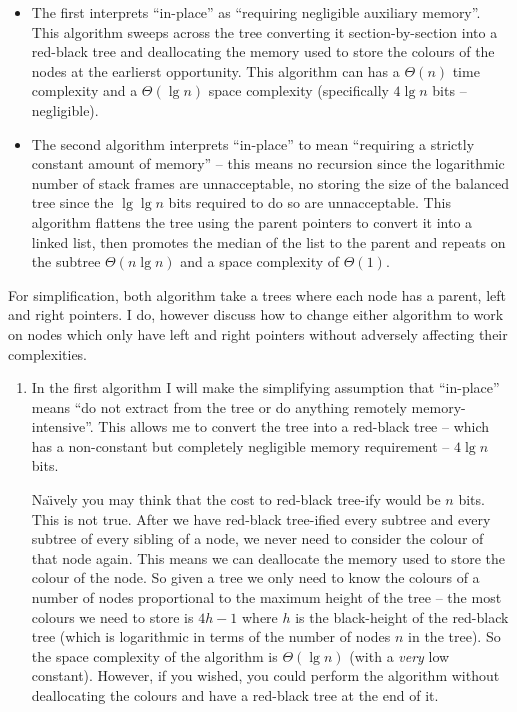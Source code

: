 \documentclass[10pt,\jkfside,a4paper]{article}
\begin{document}
\begin{enumerate}
\begin{itemize}

\item The first interprets ``in-place'' as ``requiring negligible auxiliary memory''. 
This algorithm sweeps across the tree converting it section-by-section into a red-black tree and deallocating 
the memory used to store the colours of the nodes at the earlierst opportunity. This algorithm can has 
a $\Theta(n)$ time complexity and a $\Theta(\lg n)$ space complexity (specifically $4\lg n$ bits -- negligible).

\item The second algorithm interprets ``in-place'' to mean ``requiring a strictly constant amount of memory'' -- 
this means no recursion since the logarithmic number of stack frames are unnacceptable, 
no storing the size of the balanced tree since the $\lg \lg n$ bits required to do so are unnacceptable. 
This algorithm flattens the tree using the parent pointers to convert it into a linked list, then 
promotes the median of the list to the parent and repeats on the subtree
$\Theta(n \lg n)$ and a space complexity of $\Theta(1)$.

\end{itemize}

For simplification, both algorithm take a trees where each node has a parent, left and right pointers. 
I do, however discuss how to change either algorithm to work on nodes which only have left and right pointers 
without adversely affecting their complexities.

\begin{enumerate}

\item In the first algorithm I will make the simplifying assumption that ``in-place'' means ``do not 
extract from the tree or do anything remotely memory-intensive''. This allows me to convert the tree into 
a red-black tree -- which has a non-constant but completely negligible memory requirement -- $4 \lg n$ bits.

Na\"{\i}vely you may think that the cost to red-black tree-ify would be $n$ bits. This is not true. After we
have red-black tree-ified every subtree and every subtree of every sibling of a node, we never need to consider 
the colour of that node again. This means we can deallocate the memory used to store the colour of the node. 
So given a tree we only need to know the colours of a number of nodes proportional to the maximum 
height of the tree -- the most colours we need to store is $4h - 1$ where $h$ is the black-height of the red-black 
tree (which is logarithmic in terms of the number of nodes $n$ in the tree). So the space complexity of the algorithm 
is $\Theta(\lg n)$ (with a \textit{very} low constant). However, if you wished, you could perform the 
algorithm without deallocating the colours and have a red-black tree at the end of it.


\end{enumerate}
\end{enumerate}
\end{document}
